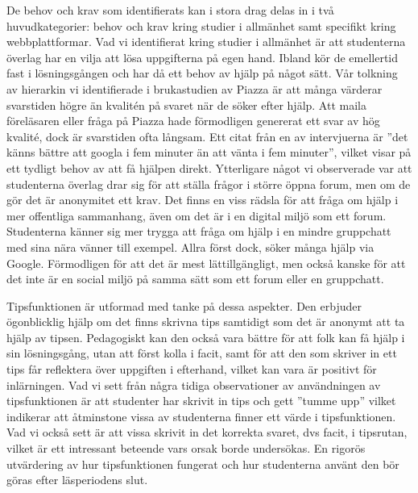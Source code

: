 De behov och krav som identifierats kan i stora drag delas in i två huvudkategorier: behov och krav kring studier i allmänhet samt specifikt kring webbplattformar. Vad vi identifierat kring studier i allmänhet är att studenterna överlag har en vilja att lösa uppgifterna på egen hand. Ibland kör de emellertid fast i lösningsgången och har då ett behov av hjälp på något sätt. Vår tolkning av hierarkin vi identifierade i brukastudien av Piazza är att många värderar svarstiden högre än kvalitén på svaret när de söker efter hjälp. Att maila föreläsaren eller fråga på Piazza hade förmodligen genererat ett svar av hög kvalité, dock är svarstiden ofta långsam. Ett citat från en av intervjuerna är ''det känns bättre att googla i fem minuter än att vänta i fem minuter'', vilket visar på ett tydligt behov av att få hjälpen direkt. Ytterligare något vi observerade var att studenterna överlag drar sig för att ställa frågor i större öppna forum, men om de gör det är anonymitet ett krav. Det finns en viss rädsla för att fråga om hjälp i mer offentliga sammanhang, även om det är i en digital miljö som ett forum. Studenterna känner sig mer trygga att fråga om hjälp i en mindre gruppchatt med sina nära vänner till exempel. Allra först dock, söker många hjälp via Google. Förmodligen för att det är mest lättillgängligt, men också kanske för att det inte är en social miljö på samma sätt som ett forum eller en gruppchatt. 

Tipsfunktionen är utformad med tanke på dessa aspekter. Den erbjuder ögonblicklig hjälp om det finns skrivna tips samtidigt som det är anonymt att ta hjälp av tipsen. Pedagogiskt kan den också vara bättre för att folk kan få hjälp i sin lösningsgång, utan att först kolla i facit, samt för att den som skriver in ett tips får reflektera över uppgiften i efterhand, vilket kan vara är positivt för inlärningen. Vad vi sett från några tidiga observationer av användningen av tipsfunktionen är att studenter har skrivit in tips och gett ”tumme upp” vilket indikerar att åtminstone vissa av studenterna finner ett värde i tipsfunktionen. Vad vi också sett är att vissa skrivit in det korrekta svaret, dvs facit, i tipsrutan, vilket är ett intressant beteende vars orsak borde undersökas. En rigorös utvärdering av hur tipsfunktionen fungerat och hur studenterna använt den bör göras efter läsperiodens slut. 

